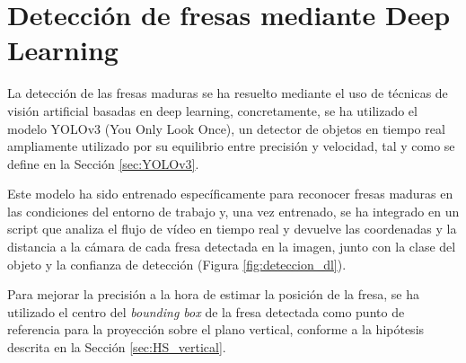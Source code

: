 \section{Detección de fresas mediante Deep Learning}
\label{sec:Tecnica_Vision}

La detección de las fresas maduras se ha resuelto mediante el uso de técnicas de visión artificial basadas en deep learning, concretamente, se ha utilizado el modelo YOLOv3 (You Only Look Once), un detector de objetos en tiempo real ampliamente utilizado por su equilibrio entre precisión y velocidad, tal y como se define en la Sección \ref{sec:YOLOv3}.

Este modelo ha sido entrenado específicamente para reconocer fresas maduras en las condiciones del entorno de trabajo y, una vez entrenado, se ha integrado en un script que analiza el flujo de vídeo en tiempo real y devuelve las coordenadas y la distancia a la cámara de cada fresa detectada en la imagen, junto con la clase del objeto y la confianza de detección (Figura \ref{fig:deteccion_dl}).

\pagebreak
Para mejorar la precisión a la hora de estimar la posición de la fresa, se ha utilizado el centro del \textit{bounding box} de la fresa detectada como punto de referencia para la proyección sobre el plano vertical, conforme a la hipótesis descrita en la Sección \ref{sec:HS_vertical}.

